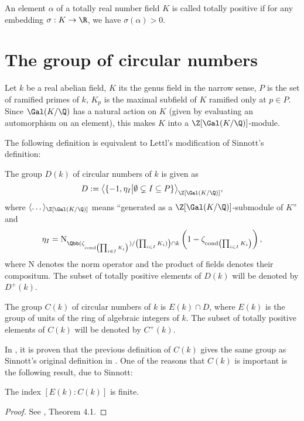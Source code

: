 \begin{definition}
An element $\alpha$ of a totally real number field $K$ is called totally positive if for any embedding $\sigma: K\to \R$, we have $\sigma(\alpha)>0$.
\end{definition}

\section{The group of circular numbers}
Let $k$ be a real abelian field, $K$ its the genus field in the narrow sense, $P$ is the set of ramified primes of $k$, $K_p$ is the maximal subfield of $K$ ramified only at $p\in P$. Since $\Gal(K/\Q)$ has a natural action on $K$ (given by evaluating an automorphism on an element), this makes $K$ into a $\Z[\Gal(K/\Q)]$-module. 

The following definition is equivalent to Lettl's modification of Sinnott's definition:
\begin{definition}
The group $D(k)$ of circular numbers of $k$ is given as
$$D:=\big\langle \{-1, \eta_I \big\vert \emptyset \subsetneq I \subseteq P \}\big\rangle_{\Z[\Gal(K/\Q)]},$$
where $\langle \dots \rangle_{\Z[\Gal(K/\Q)]}$ means \enquote{generated as a $\Z[\Gal(K/\Q)]$-submodule of $K$} and $$\eta_I=\text{N}_{\Qbb(\zeta_{\text{cond} \left(\prod_{i\in I}K_i\right)})/\left(\prod_{i\in I}K_i)\right)\cap k}\left(1-\zeta_{\text{cond} \left(\prod_{i\in I}K_i\right)}\right),$$ where $\text{N}$ denotes the norm operator and the product of fields denotes their compositum. The subset of totally positive elements of $D(k)$ will be denoted by $D^+(k)$.
\end{definition}

\begin{definition}
The group $C(k)$ of circular numbers of $k$ is $E(k)\cap D$, where $E(k)$ is the group of units of the ring of algebraic integers of $k$. The subset of totally positive elements of $C(k)$ will be denoted by $C^+(k)$.
\end{definition}

In \citep{Lettl1990}, it is proven that the previous definition of $C(k)$ gives the same group as Sinnott's original definition in \citep{SinnottAb}. One of the reasons that $C(k)$ is important is the following result, due to Sinnott:
\begin{theorem}\label{finind}
The index $[E(k):C(k)]$ is finite.
\end{theorem}
\begin{proof}
See \citep{SinnottAb}, Theorem 4.1.
\end{proof}

